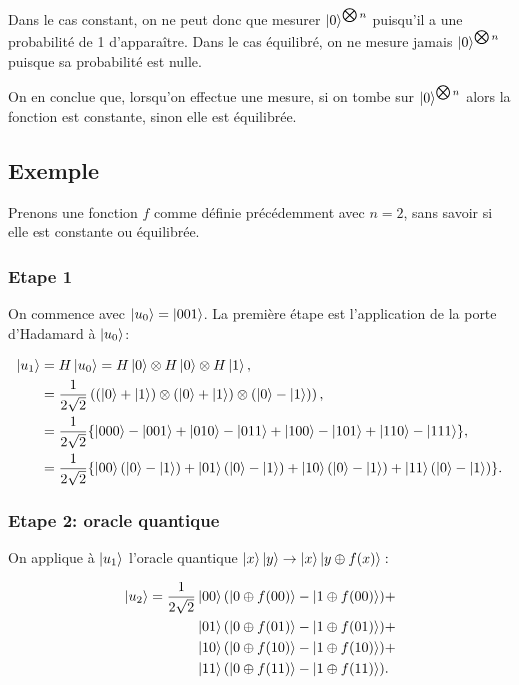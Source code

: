 Dans le cas constant, on ne peut donc que mesurer $\ket{0}^{\bigotimes n}$ puisqu'il a une probabilité de 1 d'apparaître. Dans le cas équilibré, on ne mesure jamais $\ket{0}^{\bigotimes n}$ puisque sa probabilité est nulle.

On en conclue que, lorsqu'on effectue une mesure, si on tombe sur $\ket{0}^{\bigotimes n}$ alors la fonction est constante, sinon elle est équilibrée.

\subsection{Exemple}

Prenons une fonction $f$ comme définie précédemment avec $n=2$, sans
savoir si elle est constante ou équilibrée.

\subsubsection{Etape 1}


On commence avec $\ket{u_0} = \ket{001}$. La première étape est
l'application de la porte d'Hadamard à $\ket{u_0}$:

\begin{align}
\ket{u_1} &= H\ket{u_0} = H\ket{0} \otimes H\ket{0} \otimes H\ket{1} \nonumber ,\\
& = \frac{1}{2\sqrt{2}} \left( (\ket{0} + \ket{1})\otimes(\ket{0} + \ket{1})\otimes(\ket{0} - \ket{1}) \right) \nonumber ,\\
 & = \frac{1}{2\sqrt{2}}\{\ket{000} - \ket{001} + \ket{010} - \ket{011} + \ket{100} - \ket{101} + \ket{110} - \ket{111}\} \nonumber ,\\
& = \frac{1}{2\sqrt{2}}\{\ket{00}(\ket{0} - \ket{1}) + \ket{01}(\ket{0} - \ket{1}) + \ket{10}(\ket{0} - \ket{1}) + \ket{11}(\ket{0} - \ket{1})\} .
\end{align}


\subsubsection{Etape 2: oracle quantique}

On applique à $\ket{u_1}$ l'oracle quantique $\ket{x}\ket{y}\rightarrow\ket{x}\ket{y\oplus f(x)}:$

\begin{align*}
\ket{u_2}  =  \frac{1}{2\sqrt{2}}  & \ket{00}(\ket{0 \oplus f(00)} - \ket{1 \oplus f(00)}) + \\
& \ket{01}(\ket{0 \oplus f(01)} - \ket{1 \oplus f(01)}) + \\
& \ket{10}(\ket{0 \oplus f(10)} - \ket{1 \oplus f(10)}) + \\
& \ket{11}(\ket{0 \oplus f(11)} - \ket{1 \oplus f(11)}).
\end{align*}


